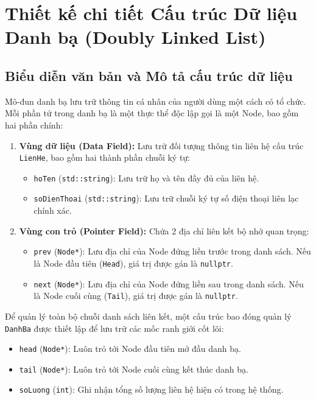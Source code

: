 \section{Thiết kế chi tiết Cấu trúc Dữ liệu Danh bạ (Doubly Linked List)}

\subsection{Biểu diễn văn bản và Mô tả cấu trúc dữ liệu}
Mô-đun danh bạ lưu trữ thông tin cá nhân của người dùng một cách có tổ chức. Mỗi phần tử trong danh bạ là một thực thể độc lập gọi là một Node, bao gồm hai phần chính:
\begin{enumerate}
    \item \textbf{Vùng dữ liệu (Data Field):} Lưu trữ đối tượng thông tin liên hệ cấu trúc \texttt{LienHe}, bao gồm hai thành phần chuỗi ký tự:
    \begin{itemize}
        \item \texttt{hoTen} (\texttt{std::string}): Lưu trữ họ và tên đầy đủ của liên hệ.
        \item \texttt{soDienThoai} (\texttt{std::string}): Lưu trữ chuỗi ký tự số điện thoại liên lạc chính xác.
    \end{itemize}
    \item \textbf{Vùng con trỏ (Pointer Field):} Chứa 2 địa chỉ liên kết bộ nhớ quan trọng:
    \begin{itemize}
        \item \texttt{prev} (\texttt{Node*}): Lưu địa chỉ của Node đứng liền trước trong danh sách. Nếu là Node đầu tiên (\texttt{Head}), giá trị được gán là \texttt{nullptr}.
        \item \texttt{next} (\texttt{Node*}): Lưu địa chỉ của Node đứng liền sau trong danh sách. Nếu là Node cuối cùng (\texttt{Tail}), giá trị được gán là \texttt{nullptr}.
    \end{itemize}
\end{enumerate}

Để quản lý toàn bộ chuỗi danh sách liên kết, một cấu trúc bao đóng quản lý \texttt{DanhBa} được thiết lập để lưu trữ các mốc ranh giới cốt lõi:
\begin{itemize}
    \item \texttt{head} (\texttt{Node*}): Luôn trỏ tới Node đầu tiên mở đầu danh bạ.
    \item \texttt{tail} (\texttt{Node*}): Luôn trỏ tới Node cuối cùng kết thúc danh bạ.
    \item \texttt{soLuong} (\texttt{int}): Ghi nhận tổng số lượng liên hệ hiện có trong hệ thống.
\end{itemize}

